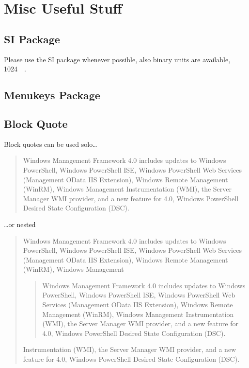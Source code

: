 \documentclass{itsarticle}
\begin{document}
\newpage

\section{Misc Useful Stuff}
\label{sec:misc_useful_stuff}

\subsection{SI Package}
\label{sub:si_package}

Please use the SI package whenever possible, also binary units are available,
\SI{1024}{\mega\byte}.

\subsection{Menukeys Package}
\label{sub:menukeys_package}




\subsection{Block Quote}
\label{sub:subsection_name}

Block quotes can be used solo\dots

\begin{quote}
    Windows Management Framework 4.0 includes updates to Windows PowerShell,
    Windows PowerShell ISE, Windows PowerShell Web Services (Management OData
    IIS Extension), Windows Remote Management (WinRM), Windows Management
    Instrumentation (WMI), the Server Manager WMI provider, and a new feature
    for 4.0, Windows PowerShell Desired State Configuration (DSC).
\end{quote}

\dots or nested

\begin{quote}
    Windows Management Framework 4.0 includes updates to Windows PowerShell,
    Windows PowerShell ISE, Windows PowerShell Web Services (Management OData
    IIS Extension), Windows Remote Management (WinRM), Windows Management

    \begin{quote}
        Windows Management Framework 4.0 includes updates to Windows PowerShell,
        Windows PowerShell ISE, Windows PowerShell Web Services (Management OData
        IIS Extension), Windows Remote Management (WinRM), Windows Management
        Instrumentation (WMI), the Server Manager WMI provider, and a new feature
        for 4.0, Windows PowerShell Desired State Configuration (DSC).
    \end{quote}

    Instrumentation (WMI), the Server Manager WMI provider, and a new feature
    for 4.0, Windows PowerShell Desired State Configuration (DSC).
\end{quote}
\end{document}
